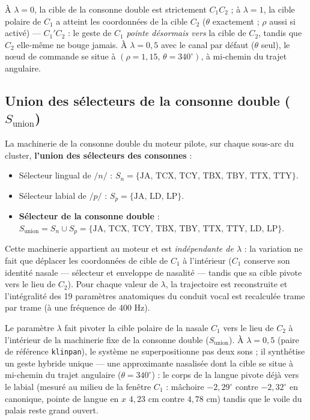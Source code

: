 \documentclass[11pt,a4paper]{article}
\begin{document}
\noindent À $\lambda = 0$, la cible de la consonne double est strictement $C_1C_2$ ; à $\lambda = 1$, la cible polaire de $C_1$ a atteint les coordonnées de la cible $C_2$ ($\theta$ exactement ; $\rho$ aussi si activé) --- $C_1'C_2$ : le geste de $C_1$ \emph{pointe désormais vers} la cible de $C_2$, tandis que $C_2$ elle-même ne bouge jamais. À $\lambda = 0{,}5$ avec le canal par défaut ($\theta$ seul), le nœud de commande se situe à $(\rho = 1{,}15,\, \theta = 340^\circ)$, à mi-chemin du trajet angulaire.

\subsection{Union des sélecteurs de la consonne double ($S_{\text{union}}$)}
La machinerie de la consonne double du moteur pilote, sur chaque sous-arc du cluster, \textbf{l'union des sélecteurs des consonnes} :
\begin{itemize}[leftmargin=*]
    \item Sélecteur lingual de $/n/$ : $S_n = \{\text{JA, TCX, TCY, TBX, TBY, TTX, TTY}\}$.
    \item Sélecteur labial de $/p/$ : $S_p = \{\text{JA, LD, LP}\}$.
    \item \textbf{Sélecteur de la consonne double} : $S_{\text{union}} = S_n \cup S_p = \{\text{JA, TCX, TCY, TBX, TBY, TTX, TTY, LD, LP}\}$.
\end{itemize}

Cette machinerie appartient au moteur et est \emph{indépendante de $\lambda$} : la variation ne fait que déplacer les coordonnées de cible de $C_1$ à l'intérieur ($C_1$ conserve son identité nasale --- sélecteur et enveloppe de nasalité --- tandis que sa cible pivote vers le lieu de $C_2$). Pour chaque valeur de $\lambda$, la trajectoire est reconstruite et l'intégralité des 19 paramètres anatomiques du conduit vocal est recalculée trame par trame (à une fréquence de $400\text{ Hz}$).

\begin{summarybox}
Le paramètre $\lambda$ fait pivoter la cible polaire de la nasale $C_1$ vers le lieu de $C_2$ à l'intérieur de la machinerie fixe de la consonne double ($S_{\text{union}}$). À $\lambda = 0{,}5$ (paire de référence \texttt{klinpan}), le système ne superpositionne pas deux sons ; il synthétise un geste hybride unique --- une approximante nasalisée dont la cible se situe à mi-chemin du trajet angulaire ($\theta = 340^\circ$) : le corps de la langue pivote déjà vers le labial (mesuré au milieu de la fenêtre $C_1$ : mâchoire $-2{,}29^\circ$ contre $-2{,}32^\circ$ en canonique, pointe de langue en $x$ $4{,}23$ cm contre $4{,}78$ cm) tandis que le voile du palais reste grand ouvert.
\end{summarybox}
\end{document}
